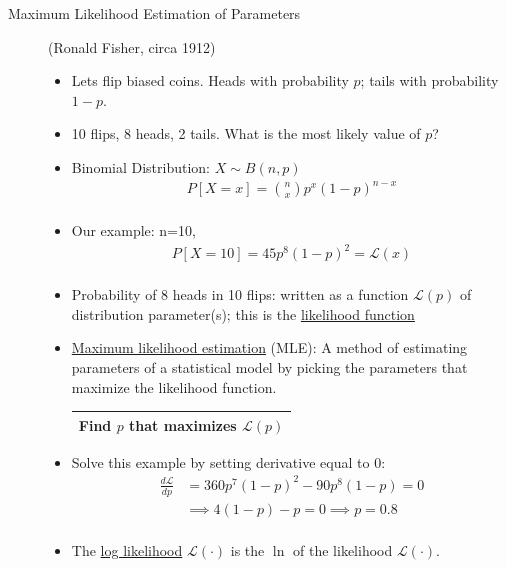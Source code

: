 \documentclass[10pt]{article}
\begin{document}
\begin{description}
	\item[Maximum Likelihood Estimation of Parameters] (Ronald Fisher, circa 1912)
		\
		\begin{itemize}
			\item Lets flip biased coins. Heads with probability $p$; tails with probability $1-p$.
			\item 10 flips, 8 heads, 2 tails. What is the most likely value of $p$?
			\item Binomial Distribution: $X \sim B(n, p)$
				\begin{align*}
					P[X=x] = {n \choose x} p^{x}(1-p)^{n-x}\\
				\end{align*}
			\item Our example: n=10,
				\begin{align*}
					P[X=10] = 45 p^{8}(1-p)^{2} = \mathcal{L}(x)\\
				\end{align*}
			\item Probability of 8 heads in 10 flips: written as a function $\mathcal{L}(p)$ of distribution parameter(s); this is the \underline{likelihood function}
			\item \underline{Maximum likelihood estimation} (MLE): A method of estimating parameters of a statistical model by picking the parameters that maximize the likelihood function.
				\begin{center}
					\begin{tabular}{| c |}
						\hline
 					Find $p$ that maximizes $\mathcal{L}(p)$\\
 					\hline
					\end{tabular}
				\end{center}
			\item Solve this example by setting derivative equal to 0:
				\begin{align*}
					\frac{d\mathcal{L}}{dp} &= 360p^{7}(1-p)^{2} - 90p^{8}(1-p) = 0\\
						&\implies 4(1-p)-p = 0 \implies p=0.8\\
				\end{align*}
			\item The \underline{log likelihood} $\mathcal{L}(\cdot)$ is the $\ln$ of the likelihood $\mathcal{L}(\cdot)$.
		\end{itemize}
	

\end{description}
\end{document}
